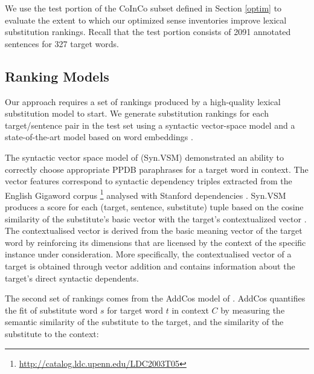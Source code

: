 \documentclass[11pt]{article}
\begin{document}

We use the test portion of the CoInCo subset defined in Section \ref{optim} to evaluate the extent to which our optimized sense inventories improve lexical substitution rankings. Recall that the test portion consists of 2091 annotated sentences for 327 target words.


\subsection{Ranking Models}

Our approach requires a set of rankings produced by a high-quality lexical substitution model to start. We generate substitution rankings for each target/sentence pair in the test set using a syntactic vector-space model \cite{thater-furstenau-pinkal:2011:IJCNLP-2011,apidianaki:2016:EMNLP2016} and a state-of-the-art model based on word embeddings \cite{melamud-levy-dagan:2015:VSM-NLP}. 

The syntactic vector space model of  (Syn.VSM) demonstrated an ability to correctly choose appropriate PPDB paraphrases for a target word in context. The vector features correspond to syntactic dependency triples extracted from the English Gigaword corpus \footnote{\url{http://catalog.ldc.upenn.edu/LDC2003T05}} analysed with Stanford dependencies \cite{mcdm:06}. Syn.VSM produces a score for each (target, sentence, substitute) tuple based on the cosine similarity of the substitute's basic vector with the target's contextualized vector \cite{thater-furstenau-pinkal:2011:IJCNLP-2011}. The contextualised vector is derived from the basic meaning vector of the target word by reinforcing its dimensions that are licensed by the context of the specific instance under consideration. More specifically, the contextualised vector of a target is obtained through vector addition and contains information about the target's direct syntactic dependents. %

The second set of rankings comes from the AddCos model of . AddCos quantifies the fit of substitute word $s$ for target word $t$ in context $C$ by measuring the semantic similarity of the substitute to the target, and the similarity of the substitute to the context:
\end{document}
